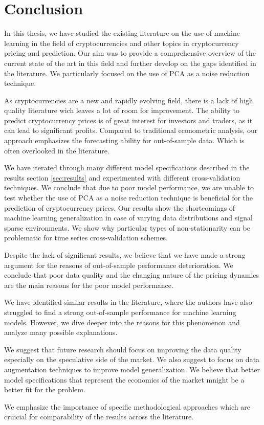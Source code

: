 \chapter{Conclusion}
\label{chap:six}

In this thesis,
we have studied the existing literature
on the use of machine learning in the field of cryptocurrencies
and other topics in cryptocurrency pricing and prediction.
Our aim was to provide a comprehensive overview of the current state
of the art in this field and further 
develop on the gaps identified in the literature.
We particularly focused on the use
of \ac{PCA} as a noise reduction technique. 

As cryptocurrencies are
a new and rapidly evolving field, there is a lack of
high quality literature wich leaves
a lot of room for improvement. 
The ability to predict cryptocurrency prices is of great interest
for investors and traders, as it can lead to significant profits.
Compared to traditional econometric analysis, 
our approach emphasizes the 
forecasting ability for out-of-sample data. Which 
is often overlooked in the literature.

We have iterated through many different model specifications 
described in the results section \ref{sec:results} and 
experimented with different cross-validation techniques.
We conclude that due to poor model performance,
we are unable to test whether the use of \ac{PCA} 
as a noise reduction
technique is beneficial for the prediction of cryptocurrency prices.
Our results show the shortcomings of
machine learning generalization in 
case of varying data distributions and
signal sparse environments.
We show why particular types of non-stationarity
can be problematic for time series cross-validation schemes.

Despite the lack of significant results,
we believe that we have made a 
strong argument 
for the reasons of 
out-of-sample performance deterioration.
We conclude that poor data quality
and the changing nature of the pricing dynamics 
are the main reasons for the poor model performance. 

We have identified similar results in the literature,
where the authors have also struggled to find a
strong out-of-sample performance for machine learning models. 
However, we dive deeper into the reasons for this phenomenon and 
analyze many possible explanations.

We suggest that future research should focus on improving the data quality
especially on the speculative side 
of the market.
We also suggest to focus on 
data augmentation techniques to improve
model generalization. We believe
that better model specifications 
that represent the economics of the market mnight be 
a better fit for the problem. 

We emphasize the importance of specific
methodological approaches which are cruicial for 
comparability of the results across the literature.
